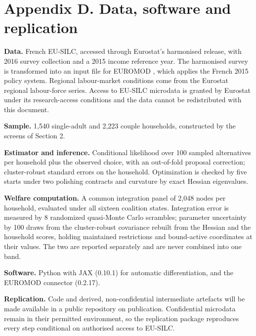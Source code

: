 \section{Appendix D. Data, software and replication}\label{appendix-d.-data-software-and-replication}

\textbf{Data.} French EU-SILC, accessed through Eurostat's harmonised release, with 2016 survey collection and a 2015 income reference year. The harmonised survey is transformed into an input file for EUROMOD \citep{sutherlandfigari2013}, which applies the French 2015 policy system. Regional labour-market conditions come from the Eurostat regional labour-force series. Access to EU-SILC microdata is granted by Eurostat under its research-access conditions and the data cannot be redistributed with this document.

\textbf{Sample.} 1,540 single-adult and 2,223 couple households, constructed by the screens of Section 2.

\textbf{Estimator and inference.} Conditional likelihood over 100 sampled alternatives per household plus the observed choice, with an out-of-fold proposal correction; cluster-robust standard errors on the household. Optimization is checked by five starts under two polishing contracts and curvature by exact Hessian eigenvalues.

\textbf{Welfare computation.} A common integration panel of 2,048 nodes per household, evaluated under all sixteen coalition states. Integration error is measured by 8 randomized quasi-Monte Carlo scrambles; parameter uncertainty by 100 draws from the cluster-robust covariance rebuilt from the Hessian and the household scores, holding maintained restrictions and bound-active coordinates at their values. The two are reported separately and are never combined into one band.

\textbf{Software.} Python with JAX (0.10.1) for automatic differentiation, and the EUROMOD connector (0.2.17).

\textbf{Replication.} Code and derived, non-confidential intermediate artefacts will be made available in a public repository on publication. Confidential microdata remain in their permitted environment, so the replication package reproduces every step conditional on authorised access to EU-SILC.

